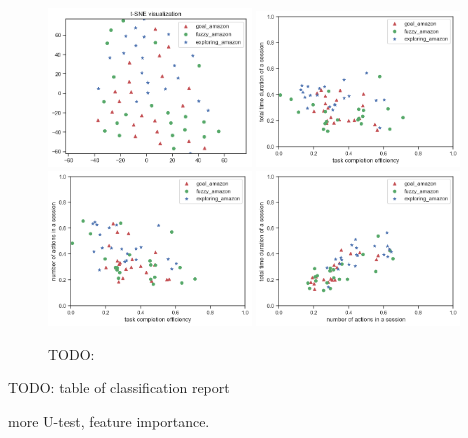 \begin{figure}[H]
    \centering
    \includegraphics[width=0.48\textwidth]{figures/tsne-amazon}
    \includegraphics[width=0.48\textwidth]{figures/2d-eff-dur-amazon}
    \includegraphics[width=0.48\textwidth]{figures/2d-eff-len-amazon}
    \includegraphics[width=0.48\textwidth]{figures/2d-len-dur-amazon}
    \caption{TODO:}
    \label{fig:general-amazon}
\end{figure}

TODO: table of classification report

more U-test, feature importance.

